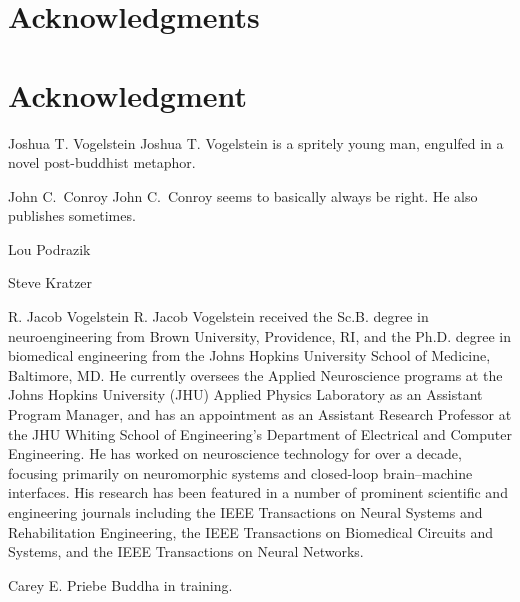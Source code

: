 \documentclass[10pt,journal,cspaper,compsoc]{IEEEtran}
\begin{document}
  \section*{Acknowledgments}
\else
  \section*{Acknowledgment}
\fi


\ifCLASSOPTIONcaptionsoff
  \newpage
\fi




\begin{IEEEbiographynophoto}{Joshua T. Vogelstein}
Joshua T. Vogelstein is a spritely young man, engulfed in a novel post-buddhist metaphor.

\end{IEEEbiographynophoto}



\begin{IEEEbiographynophoto}{John C.~Conroy}
John C.~Conroy seems to basically always be right. He also publishes sometimes.

\end{IEEEbiographynophoto}

\begin{IEEEbiographynophoto}{Lou Podrazik}

\end{IEEEbiographynophoto}

\begin{IEEEbiographynophoto}{Steve Kratzer}

\end{IEEEbiographynophoto}



\begin{IEEEbiographynophoto}{R. Jacob Vogelstein}
R. Jacob Vogelstein received the Sc.B. degree in neuroengineering from Brown University, Providence, RI, and the Ph.D. degree in biomedical engineering from the Johns Hopkins University School of Medicine, Baltimore, MD.  He currently oversees the Applied Neuroscience programs at the Johns Hopkins University (JHU) Applied Physics Laboratory as an Assistant Program Manager, and has an appointment as an Assistant Research Professor at the JHU Whiting School of Engineering’s Department of Electrical and Computer Engineering. He has worked on neuroscience technology for over a decade, focusing primarily on neuromorphic systems and closed-loop brain–machine interfaces. His research has been featured in a number of prominent scientific and engineering journals including the IEEE Transactions on Neural Systems and Rehabilitation Engineering, the IEEE Transactions on Biomedical Circuits and Systems, and the IEEE Transactions on Neural Networks.  
\end{IEEEbiographynophoto}

\begin{IEEEbiographynophoto}{Carey E. Priebe}
Buddha in training.
\end{IEEEbiographynophoto}

\end{document}
